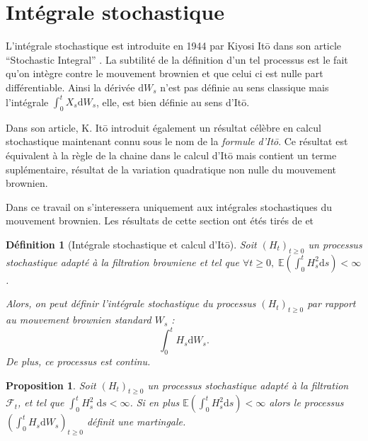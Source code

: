 \documentclass[openany]{book}
\newcommand{\F}{\mathscr{F}}
\newcommand{\E}{\mathbb{E}}
\newcommand{\1}{\mathbbm{1}}
\renewcommand{\d}{\mathrm{d}}
\theoremstyle{thmfont}
\theoremstyle{deffont}
\newtheorem{definition}[definition]{Définition}
\theoremstyle{thmfont}
\newtheorem{prop}[prop]{Proposition}
\theoremstyle{deffont}
\newtheorem{remark}[remark]{Remarque}
\begin{document}

\section{Intégrale stochastique}
L'intégrale stochastique est introduite en 1944 par Kiyosi Itō dans son article ``Stochastic Integral'' \cite{ito1944}. La subtilité de la définition d'un tel processus est le fait qu'on intègre contre le mouvement brownien et que celui ci est nulle part différentiable. Ainsi la dérivée $\d W_s$ n'est pas définie au sens classique mais l'intégrale $\int_0^t X_s \d W_s$, elle, est bien définie au sens d'Itō.

Dans son article, K. Itō introduit également un résultat célèbre en calcul stochastique maintenant connu sous le nom de la \textit{formule d'Itō}. Ce résultat est équivalent à la règle de la chaine dans le calcul d'Itō mais contient un terme suplémentaire, résultat de la variation quadratique non nulle du mouvement brownien.

Dans ce travail on s'interessera uniquement aux intégrales stochastiques du mouvement brownien. Les résultats de cette section ont étés tirés de \cite{russo} et \cite{fournier}%

\begin{definition}[Intégrale stochastique et calcul d'Itō]
  Soit $(H_t)_{t \geq 0}$ un processus stochastique adapté à la filtration browniene et tel que $\forall t \geq 0, \; \E \left(\int_0^t H_s^2 \d s\right) < \infty$.

  Alors, on peut définir \textit{l'intégrale stochastique} du processus $(H_t)_{t\geq0}$ par rapport au mouvement brownien standard $W_s$ :
  $$ \int_0^t H_s \d W_s.$$
  De plus, ce processus est continu.
\end{definition}


\begin{prop} Soit $(H_t)_{t \geq 0}$ un processus stochastique adapté à la filtration  $\F_t$, et tel que $\int_0^t H_s^2\;\d s < \infty$. Si en plus $\E\left(\int_0^tH_s^2 \d s\right) < \infty$ alors le processus $(\int_0^t H_s \d W_s)_{t\geq 0}$ définit une martingale. 
\end{prop}
\end{document}
